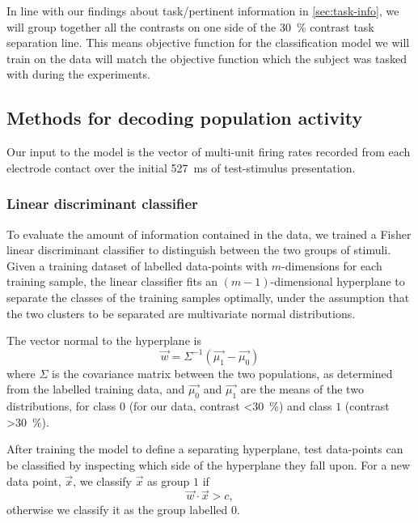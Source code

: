 
In line with our findings about task\-/pertinent information in \autoref{sec:task-info}, we will group together all the contrasts on one side of the \SI{30}{\percent} contrast task separation line.
This means objective function for the classification model we will train on the data will match the objective function which the subject was tasked with during the experiments.


\subsection{Methods for decoding population activity}

Our input to the model is the vector of multi-unit firing rates recorded from each electrode contact over the initial \SI{527}{\milli\second} of test-stimulus presentation.


\subsubsection{Linear discriminant classifier}

To evaluate the amount of information contained in the data, we trained a Fisher linear discriminant classifier to distinguish between the two groups of stimuli.
Given a training dataset of labelled data-points with $m$-dimensions for each training sample, the linear classifier fits an $(m-1)$-dimensional hyperplane to separate the classes of the training samples optimally, under the assumption that the two clusters to be separated are multivariate normal distributions.

The vector normal to the hyperplane is 
\begin{equation}
\vec{w} = \Sigma^{-1}\left(\vec{\mu_1}-\vec{\mu_0}\right)
\end{equation}
where $\Sigma$ is the covariance matrix between the two populations, as determined from the labelled training data, and $\vec{\mu_0}$ and $\vec{\mu_1}$ are the means of the two distributions, for class $0$ (for our data, contrast \SI{<30}{\percent}) and class $1$ (contrast \SI{>30}{\percent}).

After training the model to define a separating hyperplane, test data-points can be classified by inspecting which side of the hyperplane they fall upon.
For a new data point, $\vec{x}$, we classify $\vec{x}$ as group $1$ if
\begin{equation}
\vec{w}\cdot\vec{x}>c
,\end{equation}
otherwise we classify it as the group labelled $0$.


